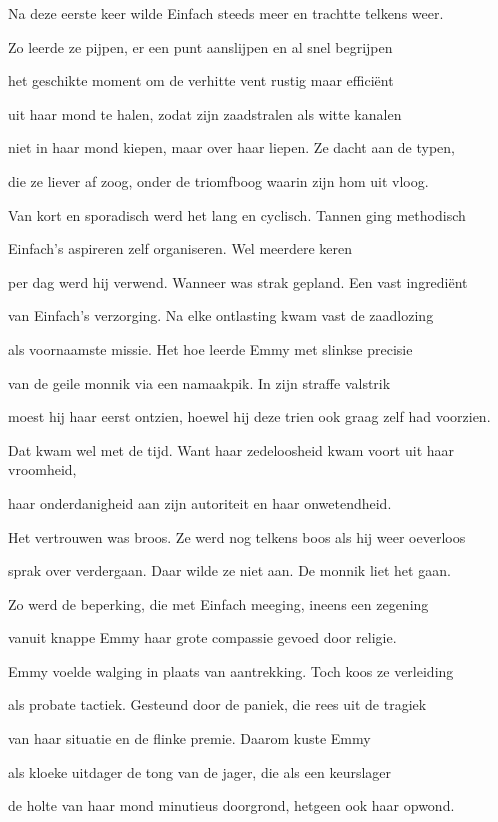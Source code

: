 Na deze eerste keer
wilde Einfach steeds meer
en trachtte telkens weer.

Zo leerde ze pijpen,
er een punt aanslijpen
en al snel begrijpen

het geschikte moment
om de verhitte vent
rustig maar efficiënt

uit haar mond te halen,
zodat zijn zaadstralen
als witte kanalen

niet in haar mond kiepen,
maar over haar liepen.
Ze dacht aan de typen,

die ze liever af zoog,
onder de triomfboog
waarin zijn hom uit vloog.

Van kort en sporadisch
werd het lang en cyclisch.
Tannen ging methodisch

Einfach’s aspireren
zelf organiseren.
Wel meerdere keren

per dag werd hij verwend.
Wanneer was strak gepland.
Een vast ingrediënt

van Einfach’s verzorging.
Na elke ontlasting
kwam vast de zaadlozing

als voornaamste missie.
Het hoe leerde Emmy
met slinkse precisie

van de geile monnik
via een namaakpik.
In zijn straffe valstrik

moest hij haar eerst ontzien,
hoewel hij deze trien
ook graag zelf had voorzien.

Dat kwam wel met de tijd. Want haar zedeloosheid
kwam voort uit haar vroomheid,

haar onderdanigheid
aan zijn autoriteit
en haar onwetendheid.

Het vertrouwen was broos.
Ze werd nog telkens boos
als hij weer oeverloos

sprak over verdergaan.
Daar wilde ze niet aan.
De monnik liet het gaan.

Zo werd de beperking,
die met Einfach meeging,
ineens een zegening

vanuit knappe Emmy
haar grote compassie
gevoed door religie.

Emmy voelde walging
in plaats van aantrekking.
Toch koos ze verleiding

als probate tactiek.
Gesteund door de paniek,
die rees uit de tragiek

van haar situatie
en de flinke premie.
Daarom kuste Emmy

als kloeke uitdager
de tong van de jager,
die als een keurslager

de holte van haar mond
minutieus doorgrond,
hetgeen ook haar opwond.

